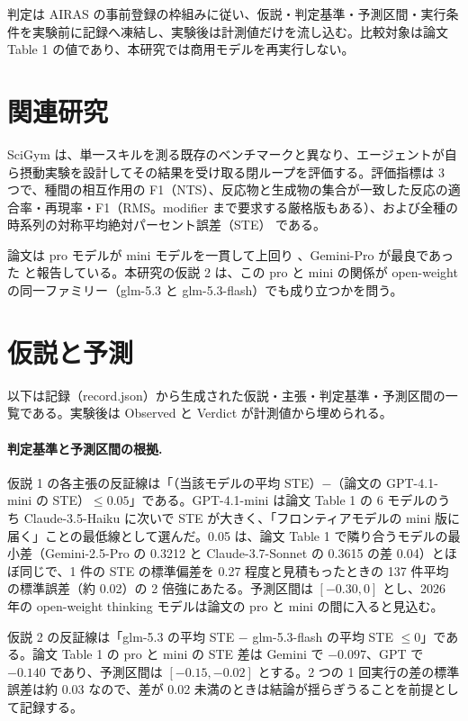 \documentclass{article}
\providecommand{\unverified}[1]{#1}
\begin{document}
判定は AIRAS の事前登録の枠組みに従い、仮説・判定基準・予測区間・実行条件を実験前に記録へ凍結し、実験後は計測値だけを流し込む。比較対象は論文 Table 1 の値であり、本研究では商用モデルを再実行しない。

\section{関連研究}
\label{sec:related}
SciGym \citep{duan-2025-measuring} は、単一スキルを測る既存のベンチマークと異なり、エージェントが自ら摂動実験を設計してその結果を受け取る閉ループを評価する。評価指標は 3 つで、種間の相互作用の F1（NTS）、反応物と生成物の集合が一致した反応の適合率・再現率・F1（RMS。modifier まで要求する厳格版もある）\cite[s1.p8]{duan-2025-measuring}、および全種の時系列の対称平均絶対パーセント誤差（STE）\cite[s1.p9]{duan-2025-measuring} である。

論文は pro モデルが mini モデルを一貫して上回り \cite[s1.p6]{duan-2025-measuring}、Gemini-Pro が最良であった \cite[s1.p7]{duan-2025-measuring} と報告している。本研究の仮説 2 は、この pro と mini の関係が open-weight の同一ファミリー（glm-5.3 と glm-5.3-flash）でも成り立つかを問う。

\section{仮説と予測}
\label{sec:hypothesis}
以下は記録（record.json）から生成された仮説・主張・判定基準・予測区間の一覧である。実験後は Observed と Verdict が計測値から埋められる。



\paragraph{判定基準と予測区間の根拠.}
仮説 1 の各主張の反証線は「（当該モデルの平均 STE）$-$（論文の GPT-4.1-mini の STE）$\le 0.05$」である。GPT-4.1-mini は論文 Table 1 の 6 モデルのうち Claude-3.5-Haiku に次いで STE が大きく、「フロンティアモデルの mini 版に届く」ことの最低線として選んだ。0.05 は、論文 Table 1 で隣り合うモデルの最小差（Gemini-2.5-Pro の \unverified{0.3212} と Claude-3.7-Sonnet の \unverified{0.3615} の差 \unverified{0.04}）とほぼ同じで、1 件の STE の標準偏差を 0.27 程度と見積もったときの 137 件平均の標準誤差（約 0.02）の 2 倍強にあたる。予測区間は $[-0.30, 0]$ とし、2026 年の open-weight thinking モデルは論文の pro と mini の間に入ると見込む。

仮説 2 の反証線は「glm-5.3 の平均 STE $-$ glm-5.3-flash の平均 STE $\le 0$」である。論文 Table 1 の pro と mini の STE 差は Gemini で $-0.097$、GPT で $-0.140$ であり、予測区間は $[-0.15, -0.02]$ とする。2 つの 1 回実行の差の標準誤差は約 0.03 なので、差が 0.02 未満のときは結論が揺らぎうることを前提として記録する。
\end{document}
